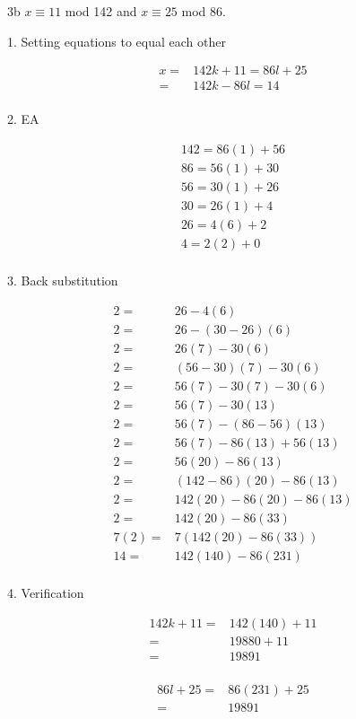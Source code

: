 \begin{question}{3b}
$x \equiv 11$ mod 142 and $x \equiv 25$ mod 86.

1. Setting equations to equal each other

\begin{align*}
x =& 142k +11 = 86l + 25\\
=& 142k -86l  = 14\\
\end{align*}

2. EA

\begin{align*}
142 = 86(1) + 56 \\
86  = 56(1) + 30 \\
56  = 30(1) + 26 \\
30  = 26(1) + 4 \\
26  = 4(6)  + 2 \\
4   = 2(2)  + 0 \\
\end{align*}

3. Back substitution

\begin{align*}
2 =& 26 - 4(6) \\
2 =& 26 - (30 - 26)(6) \\ 
2 =& 26(7) - 30(6)\\
2 =& (56-30)(7) - 30(6)\\ 
2 =& 56(7) - 30(7) - 30(6)\\ 
2 =& 56(7) - 30(13)\\ 
2 =& 56(7) - (86-56)(13)\\ 
2 =& 56(7) -86(13) +56(13)\\ 
2 =& 56(20) -86(13)\\
2 =& (142-86)(20) -86(13)\\
2 =& 142(20) -86(20) -86(13)\\
2 =& 142(20) -86(33)\\
7(2) =& 7(142(20) -86(33))\\
14 =& 142(140) -86(231)\\
\end{align*}

4. Verification

\begin{align*}
142k + 11 =& 142(140) + 11\\
=& 19880 + 11\\ 
=& 19891\\ 
\end{align*}

\begin{align*}
86l + 25 =& 86(231) + 25\\
=& 19891\\ 
\end{align*}

\end{question}

